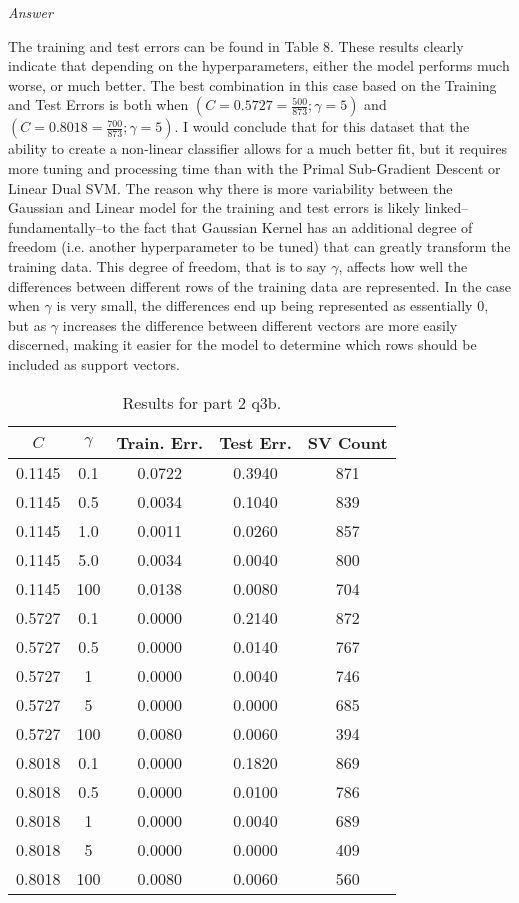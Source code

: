 \documentclass[12pt, fullpage,letterpaper]{article}
\begin{document}
\begin{enumerate}
\begin{enumerate}
	\emph{Answer}
	
	The training and test errors can be found in Table 8. These results clearly indicate that depending on the hyperparameters, either the model performs much worse, or much better. The best combination in this case based on the Training and Test Errors is both when $(C=0.5727=\frac{500}{873};\gamma=5)$ and $(C=0.8018=\frac{700}{873};\gamma=5)$. I would conclude that for this dataset that the ability to create a non-linear classifier allows for a much better fit, but it requires more tuning and processing time than with the Primal Sub-Gradient Descent or Linear Dual SVM. The reason why there is more variability between the Gaussian and Linear model for the training and test errors is likely linked--fundamentally--to the fact that Gaussian Kernel has an additional degree of freedom (i.e. another hyperparameter to be tuned) that can greatly transform the training data. This degree of freedom, that is to say $\gamma$, affects how well the differences between different rows of the training data are represented. In the case when $\gamma$ is very small, the differences end up being represented as essentially 0, but as $\gamma$ increases the difference between different vectors are more easily discerned, making it easier for the model to determine which rows should be included as support vectors.
	
	\begin{table}[h]
		\centering
		\begin{tabular}{cc|ccc}
			$C$ & $\gamma$ & Train. Err. & Test Err. & SV Count \\
			\hline\hline
            0.1145 & 0.1 & 0.0722 & 0.3940 & 871 \\ \hline
            0.1145 & 0.5 & 0.0034 & 0.1040 & 839 \\ \hline
            0.1145 & 1.0 & 0.0011 & 0.0260 & 857 \\ \hline
            0.1145 & 5.0 & 0.0034 & 0.0040 & 800 \\ \hline
            0.1145 & 100 & 0.0138 & 0.0080 & 704 \\ \hline
            0.5727 & 0.1 & 0.0000 & 0.2140 & 872 \\ \hline
            0.5727 & 0.5 & 0.0000 & 0.0140 & 767 \\ \hline
            0.5727 &  1  & 0.0000 & 0.0040 & 746 \\ \hline
            0.5727 &  5  & 0.0000 & 0.0000 & 685 \\ \hline
            0.5727 & 100 & 0.0080 & 0.0060 & 394 \\ \hline
            0.8018 & 0.1 & 0.0000 & 0.1820 & 869 \\ \hline
            0.8018 & 0.5 & 0.0000 & 0.0100 & 786 \\ \hline
            0.8018 &  1  & 0.0000 & 0.0040 & 689 \\ \hline
            0.8018 &  5  & 0.0000 & 0.0000 & 409 \\ \hline
            0.8018 & 100 & 0.0080 & 0.0060 & 560 \\ \hline
		\end{tabular}
	\caption{Results for part 2 q3b.}
	\end{table}
	

\end{enumerate}
\end{enumerate}
\end{document}
